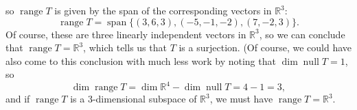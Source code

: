 \documentclass[12pt]{article}
\DeclareMathOperator{\range}{range}
\DeclareMathOperator{\nul}{null}
\DeclareMathOperator{\spn}{span}
\newcommand{\R}{\mathbb{R}}
\begin{document}
so $\range T$ is given by the span of the corresponding vectors in $\R^3$:
\[
\range T = \spn\{(3,6,3), (-5,-1,-2), (7,-2,3)\}.
\]
Of course, these are three linearly independent vectors in $\R^3$, so we can conclude that $\range T = \R^3$, which tells us that $T$ is a surjection. (Of course, we could have also come to this conclusion with much less work by noting that $\dim \nul T = 1$, so
\[
\dim \range T = \dim \R^4 - \dim \nul T = 4-1 = 3,
\]
and if $\range T$ is a 3-dimensional subspace of $\R^3$, we must have $\range T = \R^3$.                                                                                                         
                                                                                                             
\end{document}
